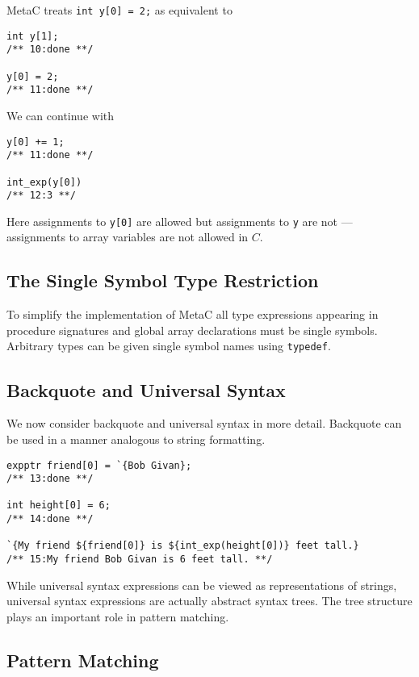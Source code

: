 \documentclass{article}
\begin{document}
MetaC treats {\tt int y[0] = 2;} as equivalent to

\begin{verbatim}
int y[1];
/** 10:done **/

y[0] = 2;
/** 11:done **/
\end{verbatim}

We can continue with

\begin{verbatim}
y[0] += 1;
/** 11:done **/

int_exp(y[0])
/** 12:3 **/
\end{verbatim}

Here assignments to {\tt y[0]} are allowed but assignments to {\tt y} are not --- assignments to array variables
are not allowed in $C$.

\subsection{The Single Symbol Type Restriction}

To simplify the implementation of MetaC all type expressions appearing in procedure signatures and global array declarations must be single symbols.
Arbitrary types can be given single symbol names using {\tt typedef}.

\subsection{Backquote and Universal Syntax}

We now consider backquote and universal syntax in more detail.  Backquote can be used in a manner analogous to string formatting.

\begin{verbatim}
expptr friend[0] = `{Bob Givan};
/** 13:done **/

int height[0] = 6;
/** 14:done **/

`{My friend ${friend[0]} is ${int_exp(height[0])} feet tall.}
/** 15:My friend Bob Givan is 6 feet tall. **/
\end{verbatim}

While universal syntax expressions can be viewed as representations of strings, universal syntax
expressions are actually abstract syntax trees. The tree structure
plays an important role in pattern matching.

\subsection{Pattern Matching}
\end{document}
